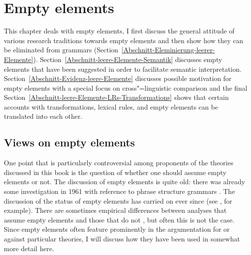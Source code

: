 
\chapter{Empty elements}
\label{Abschnitt-Diskussion-leere-Elemente}
\label{chap-empty}

This chapter deals with empty elements, I first discuss the general attitude of various research
traditions towards empty elements and then show how they can be eliminated from grammars
(Section~\ref{Abschnitt-Eleminierung-leerer-Elemente}). Section~\ref{Abschnitt-leere-Elemente-Semantik} discusses empty elements that
have been suggested in order to facilitate semantic
interpretation. Section~\ref{Abschnitt-Evidenz-leere-Elemente} discusses possible motivation for
empty elements with a special focus on cross"=linguistic comparison and the final Section~\ref{Abschnitt-leere-Elemente-LRs-Transformations} shows
that certain accounts with transformations, lexical rules, and empty elements can be translated into each other.

\section{Views on empty elements}

One point that is particularly controversial among proponents of the theories discussed in this book is the question of whether
one should assume empty elements or not. The discussion of empty elements is quite old: there was already some investigation in 1961 with reference
to phrase structure grammars \citep*{BHPS61a}.
The discussion of the status of empty elements has carried on ever since (see
\citealp*{Loebner86a,Wunderlich87d,Wunderlich89,Stechow89,Haider97a,Sag2000a,BMS2001a,LH2006a,Mueller2004e,AS2015a}, for example). 
There are sometimes empirical differences between analyses that assume empty elements and those that
do not \citep{AS2015a}, but often this is not the case. Since empty elements often feature prominently in the argumentation for or against particular theories, I will discuss
how they have been used in somewhat more detail here.

